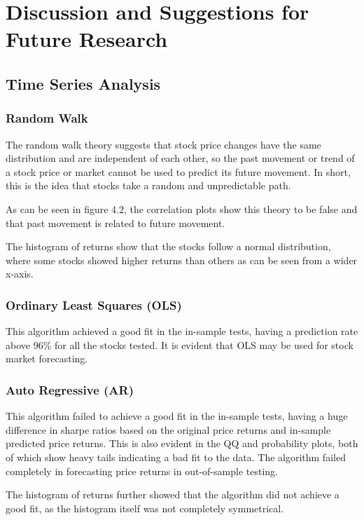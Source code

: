 \chapter{Discussion and Suggestions for Future Research}

\section{Time Series Analysis}

\subsection{Random Walk}
The random walk theory suggests that stock price changes have the same distribution and are independent of each other, so the past movement or trend of a stock price or market cannot be used to predict its future movement. In short, this is the idea that stocks take a random and unpredictable path.

As can be seen in figure 4.2, the correlation plots show this theory to be false and that past movement is related to future movement.

The histogram of returns show that the stocks follow a normal distribution, where some stocks showed higher returns than others as can be seen from a wider x-axis.

\subsection{Ordinary Least Squares (OLS)}
This algorithm achieved a good fit in the in-sample tests, having a prediction rate above 96\% for all the stocks tested. It is evident that OLS may be used for stock market forecasting.

\subsection{Auto Regressive (AR)}
This algorithm failed to achieve a good fit in the in-sample tests, having a huge difference in sharpe ratios based on the original price returns and in-sample predicted price returns. This is also evident in the QQ and probability plots, both of which show heavy tails indicating a bad fit to the data. The algorithm failed completely in forecasting price returns in out-of-sample testing. 

The histogram of returns further showed that the algorithm did not achieve a good fit, as the histogram itself was not completely symmetrical.

